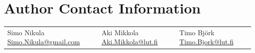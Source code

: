 \documentclass{jcgt}
\begin{document}
\section*{Author Contact Information}

\hspace{-2mm}\begin{tabular}{p{}p{}p{}}
Simo Nikula\newline
\href{mailto:Simo.Nikula@gmail.com}{Simo.Nikula@gmail.com}
&
Aki Mikkola\newline
\href{mailto:Aki.Mikkola@lut.fi}{Aki.Mikkola@lut.fi}
&
Timo Björk\newline
\href{mailto:Timo.Bjork@lut.fi}{Timo.Bjork@lut.fi}
\end{tabular}


\afterdoc
\end{document}
